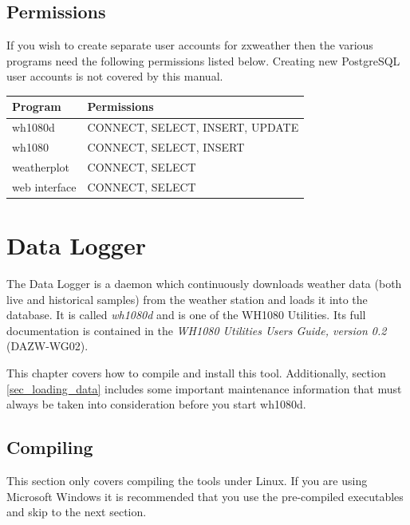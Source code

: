 \documentclass[a4paper,10pt,draft]{book}
\begin{document}
\section{Permissions}
If you wish to create separate user accounts for zxweather then the various programs need the following permissions listed below. Creating new PostgreSQL user accounts is not covered by this manual.

\begin{tabular}{l l}
\hline
\textbf{Program} & \textbf{Permissions} \\
\hline
wh1080d & CONNECT, SELECT, INSERT, UPDATE \\
wh1080 & CONNECT, SELECT, INSERT \\
weatherplot & CONNECT, SELECT \\
web interface & CONNECT, SELECT \\
\hline
\end{tabular}


\chapter{Data Logger}
\label{cha_data_logger}

The Data Logger is a daemon which continuously downloads weather data (both live and historical samples) from the weather station and loads it into the database. It is called \emph{wh1080d} and is one of the WH1080 Utilities. Its full documentation is contained in the \emph{WH1080 Utilities Users Guide, version 0.2} (DAZW-WG02).

This chapter covers how to compile and install this tool. Additionally, section \ref{sec_loading_data} includes some important maintenance information that must always be taken into consideration before you start wh1080d.

\section{Compiling}
This section only covers compiling the tools under Linux. If you are using Microsoft Windows it is recommended that you use the pre-compiled executables and skip to the next section.
\end{document}
